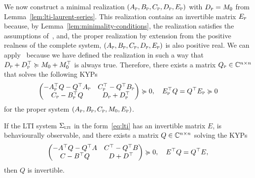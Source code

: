 We now construct a minimal realization $(A_{\textnormal{\scshape p}}, B_{\textnormal{\scshape p}}, C_{\textnormal{\scshape p}}, D_{\textnormal{\scshape p}}, E_{\textnormal{\scshape p}})$ with $D_{\textnormal{\scshape p}} = M_0$ from Lemma~\ref{lem:lti-laurent-series}.
This realization contains an invertible matrix $E_{\textnormal{\scshape p}}$ because, by Lemma~\ref{lem:minimality-conditions}, the realization satisfies the assumptions of~\cite[Theorem~6.3]{Freund2004}, and, the proper realization by extension from the positive realness of the complete system, $(A_{\textnormal{\scshape p}}, B_{\textnormal{\scshape p}}, C_{\textnormal{\scshape p}}, D_{\textnormal{\scshape p}}, E_{\textnormal{\scshape p}})$ is also positive real.
We can apply~\cite[Proposition~5.4]{CGH2022} because we have defined the realization in such a way that $D_{\textnormal{\scshape p}} + D_{\textnormal{\scshape p}}^{\top} \succcurlyeq M_0 + M_0^{\top}$ is always true.
Therefore, there exists a matrix $Q_{\textnormal{\scshape p}} \in \mathbb{C}^{n \times n}$ that solves the following \acp{KYP}
\begin{equation}\label{eq:kyp-lmi}
    \begin{pmatrix}
        -A_{\textnormal{\scshape p}}^{\top} Q - Q^{\top} A_{\textnormal{\scshape p}} & C_{\textnormal{\scshape p}}^{\top} - Q^{\top} B_{\textnormal{\scshape p}} \\
        C_{\textnormal{\scshape p}} - B_{\textnormal{\scshape p}}^{\top} Q & D_{\textnormal{\scshape p}} + D_{\textnormal{\scshape p}}^{\top}
    \end{pmatrix} \succcurlyeq 0,\quad E_{\textnormal{\scshape p}}^{\top} Q = Q^{\top} E_{\textnormal{\scshape p}} \succcurlyeq 0
\end{equation}
for the proper system $(A_{\textnormal{\scshape p}}, B_{\textnormal{\scshape p}}, C_{\textnormal{\scshape p}}, M_0, E_{\textnormal{\scshape p}})$.

\begin{lemma}\label{lem:kyp-invertible-solution}
    If the \ac{LTI} system $\Sigma_{\textnormal{\scshape lti}}$ in the form~\eqref{eq:lti} has an invertible matrix $E$, is behaviourally observable, and there exists a matrix $Q \in \mathbb{C}^{n \times n}$ solving the \acp{KYP}
    \begin{equation*}
        \begin{pmatrix}
            -A^{\top} Q - Q^{\top} A & C^{\top} - Q^{\top} B \\
            C - B^{\top} Q & D + D^{\top}
        \end{pmatrix} \succcurlyeq 0,\quad E^{\top} Q = Q^{\top} E,
    \end{equation*}
    then $Q$ is invertible.
\end{lemma}

